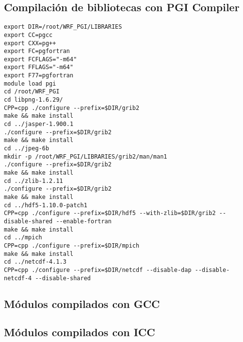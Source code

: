 \subsection{Compilación de bibliotecas con PGI Compiler}

\begin{lstlisting}
export DIR=/root/WRF_PGI/LIBRARIES
export CC=pgcc
export CXX=pg++
export FC=pgfortran
export FCFLAGS="-m64"
export FFLAGS="-m64"
export F77=pgfortran
module load pgi
cd /root/WRF_PGI
cd libpng-1.6.29/
CPP=cpp ./configure --prefix=$DIR/grib2
make && make install
cd ../jasper-1.900.1
./configure --prefix=$DIR/grib2
make && make install
cd ../jpeg-6b
mkdir -p /root/WRF_PGI/LIBRARIES/grib2/man/man1
./configure --prefix=$DIR/grib2
make && make install
cd ../zlib-1.2.11
./configure --prefix=$DIR/grib2
make && make install
cd ../hdf5-1.10.0-patch1
CPP=cpp ./configure --prefix=$DIR/hdf5 --with-zlib=$DIR/grib2 --disable-shared --enable-fortran
make && make install
cd ../mpich
CPP=cpp ./configure --prefix=$DIR/mpich
make && make install
cd ../netcdf-4.1.3
CPP=cpp ./configure --prefix=$DIR/netcdf --disable-dap --disable-netcdf-4 --disable-shared
\end{lstlisting}

\subsection{Módulos compilados con GCC}

\subsection{Módulos compilados con ICC}







